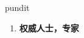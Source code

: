 
\begin{frame}
{\huge pundit}
\begin{center}
\begin{enumerate}\Large
  \item \textbf{权威人士，专家}
\end{enumerate}
\end{center}
\end{frame}
